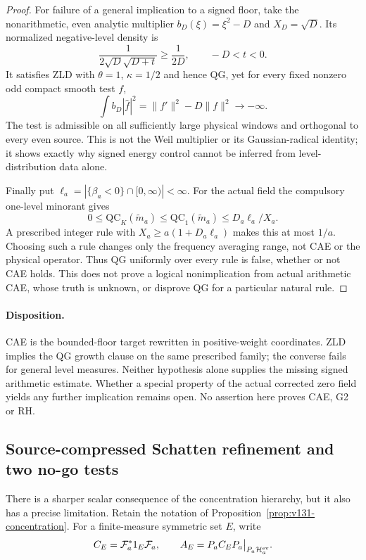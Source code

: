 \documentclass[11pt]{article}
\theoremstyle{remark}
\begin{document}
\begin{proof}
For failure of a general implication to a signed floor, take the
nonarithmetic, even analytic multiplier $b_D(\xi)=\xi^2-D$ and
$X_D=\sqrt D$. Its normalized negative-level density is
\[
 \frac{1}{2\sqrt D\sqrt{D+t}}\ge\frac1{2D},
              \qquad -D<t<0.
\]
It satisfies ZLD with $\theta=1$, $\kappa=1/2$ and hence QG, yet
for every fixed nonzero odd compact smooth test $f$,
\[
 \int b_D|\widehat f|^2=\|f'\|^2-D\|f\|^2\longrightarrow-\infty.
\]
The test is admissible on all sufficiently large physical windows
and orthogonal to every even source. This is not the Weil multiplier
or its Gaussian-radical identity; it shows exactly why signed
energy control cannot be inferred from level-distribution data alone.

Finally put $\ell_a=|\{\beta_a<0\}\cap[0,\infty)|<\infty$.
For the actual field the compulsory one-level minorant gives
\begin{equation}\label{eq:v151-cutoff-dilution}
 0\le\mathrm{QC}_K(\widetilde m_a)
 \le\mathrm{QC}_1(\widetilde m_a)\le D_a\ell_a/X_a.
\end{equation}
A prescribed integer rule with $X_a\ge a(1+D_a\ell_a)$ makes
this at most $1/a$. Choosing such a rule changes only the frequency
averaging range, not CAE or the physical operator. Thus QG uniformly over every rule is false, whether or not CAE
holds. This does not prove a logical nonimplication from actual
arithmetic CAE, whose truth is unknown, or disprove QG for a
particular natural rule.
\end{proof}

\paragraph{Disposition.}
CAE is the bounded-floor target rewritten in positive-weight coordinates.
ZLD implies the QG growth clause on the same prescribed family; the
converse fails for general level measures. Neither hypothesis alone
supplies the missing signed arithmetic estimate. Whether a special
property of the actual corrected zero field yields any further
implication remains open. No assertion here proves CAE, G2 or RH.


\subsection{Source-compressed Schatten refinement and two no-go tests}

There is a sharper scalar consequence of the concentration hierarchy,
but it also has a precise limitation. Retain the notation of
Proposition~\ref{prop:v131-concentration}. For a finite-measure
symmetric set $E$, write
\[
 C_E=\mathcal F_a^*1_E\mathcal F_a,
 \qquad A_E=P_aC_EP_a\big|_{P_a\mathcal H_a^{\rm ev}}.
\]
\end{document}
